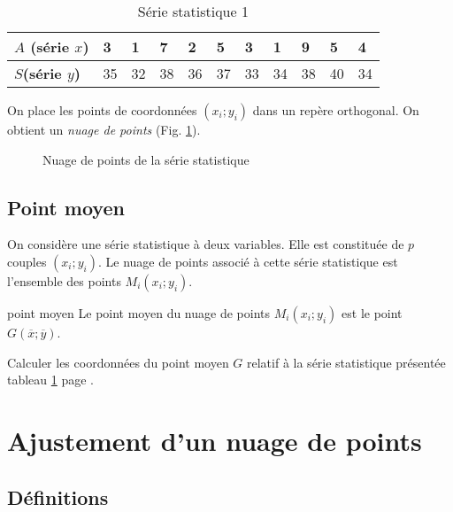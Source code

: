 \documentclass[a4paper,12pt]{scrartcl}
\begin{document}
\begin{table}[h]
\begin{center}
\begin{tabular}{|l|l|l|l|l|l|l|l|l|l|l|}
\hline
\textbf{$A$ (série $x$)} & {3} & {1} & {7} & {2} & {5} & {3} & {1} & {9} & {5} & {4}\\
\hline
\textbf{$S$(série $y$)} & {35} & {32} & {38} & {36} & {37} & {33} & {34} & {38} & {40} & {34}\\
\hline
\end{tabular}
\end{center}
\caption{Série statistique 1}
\label{tab:prems}
\end{table}

On place les points de coordonnées $(x_i;y_i)$ dans un repère orthogonal. On obtient un \emph{nuage de points} (Fig. \ref{fig:prems}).

\begin{figure}[h]
\begin{center}
\end{center} 
\caption{Nuage de points de la série statistique}
\label{fig:prems}
\end{figure}

\subsection{Point moyen}

On considère une série statistique à deux variables. Elle est constituée de $p$ couples $(x_i;y_i)$. Le nuage de points associé à cette série statistique est l'ensemble des points $M_i(x_i;y_i)$. 

\begin{definition}{point moyen}
Le point moyen du nuage de points $M_i(x_i;y_i)$ est le point $G(\overline{x};\overline{y})$. 
\end{definition}

\exemple{}

Calculer les coordonnées du point moyen $G$ relatif à la série statistique présentée tableau \ref{tab:prems} page \pageref{tab:prems}.


\section{Ajustement d'un nuage de points}

\subsection{Définitions}
\end{document}

